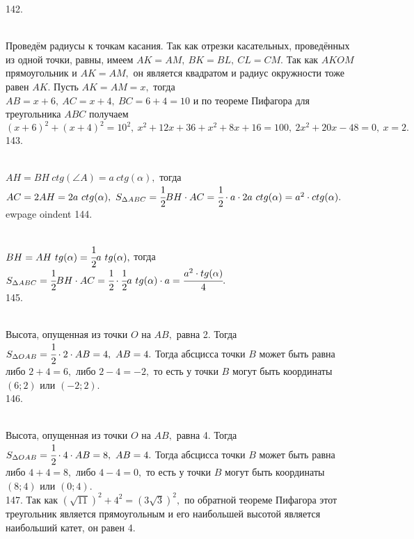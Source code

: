 142. \begin{figure}[ht!]
\end{figure}\\
Проведём радиусы к точкам касания. Так как отрезки касательных, проведённых из одной точки, равны, имеем $AK=AM,\ BK=BL,\ CL=CM.$ Так как $AKOM$ прямоугольник и $AK=AM,$ он является квадратом и радиус окружности тоже равен $AK.$ Пусть $AK=AM=x,$ тогда $AB=x+6,\ AC=x+4,\ BC=6+4=10$ и по теореме Пифагора для треугольника $ABC$ получаем $(x+6)^2+(x+4)^2=10^2,\ x^2+12x+36+x^2+8x+16=100,\ 2x^2+20x-48=0,\ x=2.$\\
143. \begin{figure}[ht!]
\end{figure}\\
$AH=BH\ ctg(\angle A)=a\ ctg(\alpha),$ тогда $AC=2AH=2a\ ctg(\alpha),\ S_{\Delta ABC}=\cfrac{1}{2}BH\cdot AC=\cfrac{1}{2}\cdot a \cdot2a\ ctg(\alpha)=a^2\cdot ctg(\alpha).$
ewpage
oindent
144. \begin{figure}[ht!]
\end{figure}\\
$BH=AH\ tg(\alpha)=\cfrac{1}{2}a\ tg(\alpha),$ тогда $S_{\Delta ABC}=\cfrac{1}{2}BH\cdot AC=\cfrac{1}{2}\cdot \cfrac{1}{2}a\ tg(\alpha)\cdot a=\cfrac{a^2\cdot tg(\alpha)}{4}.$\\
145. \begin{figure}[ht!]
\end{figure}\\
Высота, опущенная из точки $O$ на $AB,$ равна 2. Тогда $S_{\Delta OAB}=\cfrac{1}{2}\cdot 2 \cdot AB=4,\ AB=4.$ Тогда абсцисса точки $B$ может быть равна либо $2+4=6,$ либо $2-4=-2,$ то есть у точки $B$ могут быть координаты $(6;2)$ или $(-2;2).$\\
146. \begin{figure}[ht!]
\end{figure}\\
Высота, опущенная из точки $O$ на $AB,$ равна 4. Тогда $S_{\Delta OAB}=\cfrac{1}{2}\cdot 4 \cdot AB=8,\ AB=4.$ Тогда абсцисса точки $B$ может быть равна либо $4+4=8,$ либо $4-4=0,$ то есть у точки $B$ могут быть координаты $(8;4)$ или $(0;4).$\\
147. Так как $(\sqrt{11})^2+4^2=(3\sqrt{3})^2,$ по обратной теореме Пифагора этот треугольник является прямоугольным и его наибольшей высотой является наибольший катет, он равен 4.\\
